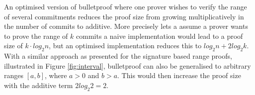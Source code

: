 An optimised version of bulletproof where one prover wishes to verify the range of several commitments reduces the proof size from growing multiplicatively in the number of commits to additive. More precisely lets a assume a prover wants to prove the range of $k$ commits a naive implementation would lead to a proof size of $k\cdot log_2 n $, but an optimised implementation reduces this to $log_2 n + 2 log_2 k$.  With a similar approach as presented for the signature based range proofs, illustrated in  Figure \ref{fig:interval},  bulletproof can also be generalised to arbitrary ranges $[a,b]$, where $a>0$ and $b>a$.  This would then increase the proof size with the additive term $2log_2 2 = 2$. 



